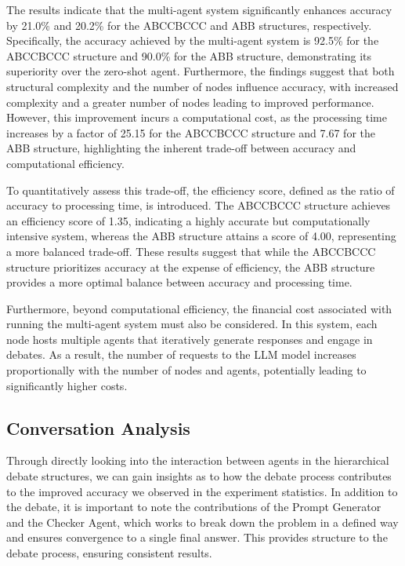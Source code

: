 The results indicate that the multi-agent system significantly enhances accuracy by 21.0\% and 20.2\% for the ABCCBCCC and ABB structures, respectively. Specifically, the accuracy achieved by the multi-agent system is 92.5\% for the ABCCBCCC structure and 90.0\% for the ABB structure, demonstrating its superiority over the zero-shot agent. Furthermore, the findings suggest that both structural complexity and the number of nodes influence accuracy, with increased complexity and a greater number of nodes leading to improved performance. However, this improvement incurs a computational cost, as the processing time increases by a factor of 25.15 for the ABCCBCCC structure and 7.67 for the ABB structure, highlighting the inherent trade-off between accuracy and computational efficiency. 

To quantitatively assess this trade-off, the efficiency score, defined as the ratio of accuracy to processing time, is introduced. The ABCCBCCC structure achieves an efficiency score of 1.35, indicating a highly accurate but computationally intensive system, whereas the ABB structure attains a score of 4.00, representing a more balanced trade-off. These results suggest that while the ABCCBCCC structure prioritizes accuracy at the expense of efficiency, the ABB structure provides a more optimal balance between accuracy and processing time.

Furthermore, beyond computational efficiency, the financial cost associated with running the multi-agent system must also be considered. In this system, each node hosts multiple agents that iteratively generate responses and engage in debates. As a result, the number of requests to the LLM model increases proportionally with the number of nodes and agents, potentially leading to significantly higher costs.

\subsection{Conversation Analysis}
Through directly looking into the interaction between agents in the hierarchical debate structures, we can gain insights as to how the debate process contributes to the improved accuracy we observed in the experiment statistics. In addition to the debate, it is important to note the contributions of the Prompt Generator and the Checker Agent, which works to break down the problem in a defined way and ensures convergence to a single final answer. This provides structure to the debate process, ensuring consistent results. 

